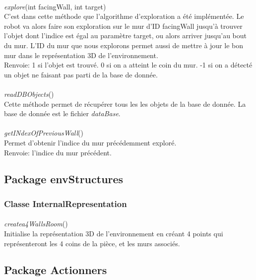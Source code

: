 \documentclass[12pt]{report}
\begin{document}
\paragraph{}
\textit{explore}(int facingWall, int target)\\
C'est dans cette méthode que l'algorithme d'exploration a été implémentée. Le robot va alors faire son exploration sur le mur d'ID facingWall jusqu'à trouver l'objet dont l'indice est égal au paramètre target, ou alors arriver jusqu'au bout du mur. L'ID du mur que nous explorons permet aussi de mettre à jour le bon mur dans le représentation 3D de l'environnement.\\
Renvoie: 1 si l'objet est trouvé. 0 si on a atteint le coin du mur. -1 si on a détecté un objet ne faisant pas parti de la base de donnée.

\paragraph{}
\textit{readDBObjects}()\\
Cette méthode permet de récupérer tous les les objets de la base de donnée. La base de donnée est le fichier \textit{dataBase}.

\paragraph{}
\textit{getINdexOfPreviousWall}()\\
Permet d'obtenir l'indice du mur précédemment exploré.\\
Renvoie: l'indice du mur précédent.

\subsection{Package envStructures}

\subsubsection{Classe InternalRepresentation}

\paragraph{}
\textit{createa4WallsRoom}()\\
Initialise la représentation 3D de l'environnement en créant 4 points qui représenteront les 4 coins de la pièce, et les murs associés.

\subsection{Package Actionners}
\end{document}
